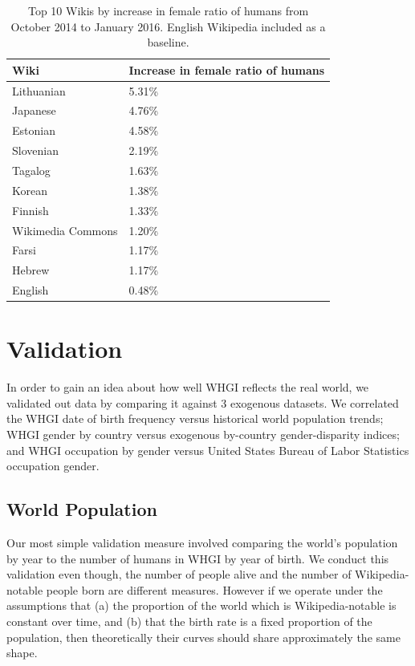\documentclass[letterpaper]{article}
\begin{document}
\begin{table}
\caption{Top 10 Wikis by increase in female ratio of humans from October 2014 to January 2016. English Wikipedia included as a baseline.}
\label{table:top10}
\begin{tabular}{p{2cm}p{2cm}}
\toprule
{Wiki} &     Increase in female ratio of humans  \\
\midrule
Lithuanian      & 5.31\% \\
Japanese     & 4.76\% \\
Estonian      & 4.58\% \\
Slovenian      & 2.19\% \\
Tagalog      & 1.63\% \\
Korean      & 1.38\% \\
Finnish      & 1.33\% \\
Wikimedia Commons & 1.20\% \\
Farsi      & 1.17\% \\
Hebrew      & 1.17\% \\
English      & 0.48\% \\
\bottomrule
\end{tabular}
\end{table}

\section{Validation}
In order to gain an idea about how well WHGI reflects the real world, we validated out data by comparing it against 3 exogenous datasets. We correlated the WHGI date of birth frequency versus historical world population trends; WHGI gender by country versus exogenous by-country gender-disparity indices; and WHGI occupation by gender versus United States Bureau of Labor Statistics occupation gender.

\subsection{World Population} Our most simple validation measure involved comparing the world's population by year to the number of humans in WHGI by year of birth. We conduct this validation even though, the number of people alive and the number of Wikipedia-notable people born are different measures. However if we operate under the assumptions that (a) the proportion of the world which is Wikipedia-notable is constant over time, and (b) that the birth rate is a fixed proportion of the population, then theoretically their curves should share approximately the same shape. 
\end{document}
